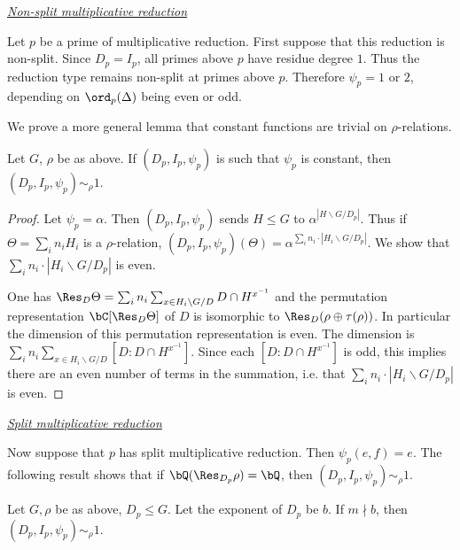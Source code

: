 \noindent\underline{\textit{Non-split multiplicative reduction}}

Let $p$ be a prime of multiplicative reduction. First suppose that this reduction is non-split. Since $D_p = I_p$, all primes above $p$ have residue degree $1$. Thus the reduction type remains non-split at primes above $p$. Therefore $\psi_p = 1$ or $2$, depending on $\ord_p(\Delta)$ being even or odd. 

We prove a more general lemma that constant functions are trivial on $\rho$-relations.

\begin{lemma}
Let $G$, $\rho$ be as above. If $(D_p, I_p, \psi_p)$ is such that $\psi_p$ is constant, then $(D_p, I_p, \psi_p) \sim_{\rho} 1$.  
\end{lemma}   

\begin{proof}
    Let $\psi_p = \alpha$. Then $(D_p, I_p, \psi_p)$ sends $H \leq G$ to $\alpha^{| H \backslash G / D_p|}$. Thus if $\Theta = \sum_i n_i H_i$ is a $\rho$-relation, $(D_p, I_p, \psi_p)(\Theta) = \alpha^{ \sum_i n_i \cdot | H_i \backslash G / D_p|}$. We show that $\sum_i n_i \cdot | H_i \backslash G / D_p|$ is even. 

    One has $\Res_D \Theta = \sum_i n_i \sum_{x \in H_i \backslash G / D} D \cap H^{x^{-1}}$ and the permutation representation $\bC[\Res_D \Theta]$ of $D$ is isomorphic to $\Res_D (\rho \oplus \tau(\rho))$. In particular the dimension of this permutation representation is even. The dimension is $\sum_i n_i \sum_{x \in H_i \backslash G / D} [D \colon D \cap H^{x^{-1}} ]$. Since each $[D \colon D \cap H^{x^{-1}} ]$ is odd, this implies there are an even number of terms in the summation, i.e. that $\sum_i n_i \cdot | H_i \backslash G / D_p|$ is even. 
    
\end{proof}

\noindent\underline{\textit{Split multiplicative reduction}}

Now suppose that $p$ has split multiplicative reduction. Then $\psi_p(e, f) = e$.
The following result shows that if $\bQ(\Res_{D_p}\rho ) = \bQ$, then $(D_p, I_p, \psi_p) \sim_{\rho} 1$.

\begin{lemma}\label{rational-res}
    Let $G, \rho$ be as above, $D_p \leq G$. Let the exponent of $D_p$ be $b$. If $m \nmid b$, then $(D_p, I_p, \psi_p) \sim_{\rho} 1$. 
\end{lemma}

